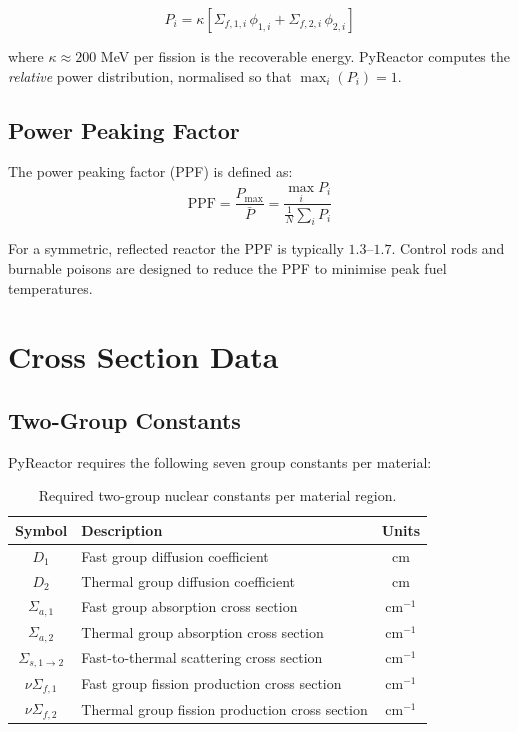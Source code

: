 \documentclass[12pt,a4paper]{article}
\begin{document}
\begin{eqbox}
\begin{equation}
  P_i = \kappa \left[\Sigma_{f,1,i}\,\phi_{1,i} + \Sigma_{f,2,i}\,\phi_{2,i}\right]
  \label{eq:power}
\end{equation}
\end{eqbox}

where $\kappa \approx 200$ MeV per fission is the recoverable energy.
PyReactor computes the \textit{relative} power distribution,
normalised so that $\max_i(P_i) = 1$.

\subsection{Power Peaking Factor}

The power peaking factor (PPF) is defined as:
\begin{equation}
  \text{PPF} = \frac{P_{\max}}{\bar{P}}
  = \frac{\max_i P_i}{\frac{1}{N}\sum_i P_i}
\end{equation}

For a symmetric, reflected reactor the PPF is typically $1.3$--$1.7$.
Control rods and burnable poisons are designed to reduce the PPF
to minimise peak fuel temperatures.

\section{Cross Section Data}

\subsection{Two-Group Constants}

PyReactor requires the following seven group constants per material:

\begin{table}[h!]
\centering
\begin{tabular}{clc}
\toprule
\textbf{Symbol} & \textbf{Description} & \textbf{Units} \\
\midrule
$D_1$           & Fast group diffusion coefficient     & cm \\
$D_2$           & Thermal group diffusion coefficient  & cm \\
$\Sigma_{a,1}$  & Fast group absorption cross section  & cm$^{-1}$ \\
$\Sigma_{a,2}$  & Thermal group absorption cross section & cm$^{-1}$ \\
$\Sigma_{s,1\to2}$ & Fast-to-thermal scattering cross section & cm$^{-1}$ \\
$\nu\Sigma_{f,1}$ & Fast group fission production cross section & cm$^{-1}$ \\
$\nu\Sigma_{f,2}$ & Thermal group fission production cross section & cm$^{-1}$ \\
\bottomrule
\end{tabular}
\caption{Required two-group nuclear constants per material region.}
\end{table}
\end{document}
